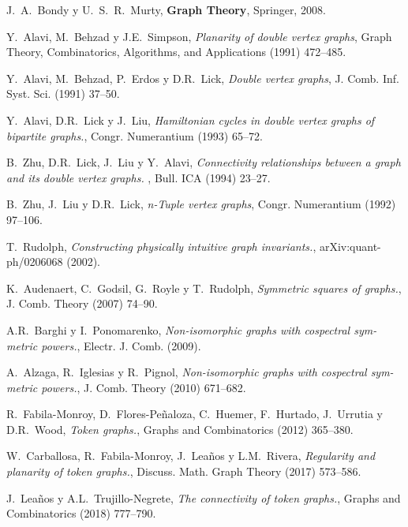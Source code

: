 \begin{thebibliography}{99}

  J.~A.~Bondy y U.~S.~R.~Murty,
  \textbf{Graph Theory},
  Springer, 2008.

  Y.~Alavi, M.~Behzad y J.E.~Simpson,
  \textit{Planarity of double vertex graphs},
  Graph Theory, Combinatorics, Algorithms, and Applications (1991) 472--485.

 Y.~Alavi, M.~Behzad, P.~Erdos y D.R.~Lick,
 \textit{Double vertex graphs},
 J. Comb. Inf. Syst. Sci. (1991) 37--50.

 Y.~Alavi, D.R.~Lick y J.~Liu,
 \textit{Hamiltonian cycles in double vertex graphs of bipartite graphs.},
 Congr. Numerantium (1993) 65--72.

  B.~Zhu, D.R.~Lick, J.~Liu y Y.~Alavi,
 \textit{Connectivity relationships between a graph and
 its double vertex graphs. },
 Bull. ICA (1994) 23--27.

  B.~Zhu, J.~Liu y D.R.~Lick,
 \textit{n-Tuple vertex graphs},
 Congr. Numerantium (1992) 97--106.

T.~Rudolph,
 \textit{Constructing physically intuitive graph invariants.},
 arXiv:quant-ph/0206068 (2002).

  K.~Audenaert, C.~Godsil, G.~Royle y T.~Rudolph,
  \textit{Symmetric squares of graphs.},
  J. Comb. Theory (2007) 74--90. 

  A.R.~Barghi y I.~Ponomarenko,
  \textit{Non-isomorphic graphs with cospectral sym-
  metric powers.},
  Electr. J. Comb. (2009). 

  A.~Alzaga, R.~Iglesias y  R.~Pignol,
  \textit{Non-isomorphic graphs with cospectral sym-
  metric powers.},
  J. Comb. Theory (2010) 671--682. 

  R.~Fabila-Monroy, D.~Flores-Pe\~{n}aloza, C.~Huemer, F.~Hurtado, J.~Urrutia y
D.R.~Wood,
  \textit{Token graphs.},
  Graphs and Combinatorics (2012) 365--380. 

  W.~Carballosa, R.~Fabila-Monroy, J.~Lea\~{n}os y L.M.~Rivera,
  \textit{Regularity and
  planarity of token graphs.},
  Discuss. Math. Graph Theory (2017) 573--586. 

  J.~Lea\~{n}os y A.L.~Trujillo-Negrete,
  \textit{The connectivity of token graphs.},
  Graphs and Combinatorics (2018) 777--790. 


\end{thebibliography}
